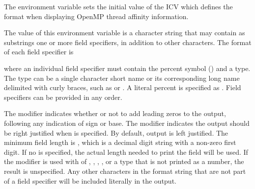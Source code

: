 The  environment variable sets the initial value of the
 ICV which defines the format when displaying OpenMP
thread affinity information.


The value of this environment variable is a character string that may contain as
substrings one or more field specifiers, in addition to other characters.
The format of each field specifier is

\begin{ompSyntax}
\end{ompSyntax}

where an individual field specifier must contain the percent symbol ({\pcode{\%}}) and a type.
The type can be a single character short name or its corresponding long name delimited with curly braces,
 such as {} or {}.
A literal percent is specified as {\pcode{\%\%}}.  Field specifiers can be provided in any order.

The  modifier indicates whether or not to add leading zeros to the output,
following any indication of sign or base.
The  modifier indicates the output should be right justified when  is specified.
By default, output is left justified.
The minimum field length is , which is a decimal digit string
with a non-zero first digit.
If no  is specified, the actual length needed to print the field will be used.
If the  modifier is used with  of , {},
, {}, or a type that is not printed as a number, the
result is unspecified.
Any other characters in the format string that are not part of a field specifier will be included literally
in the output.


